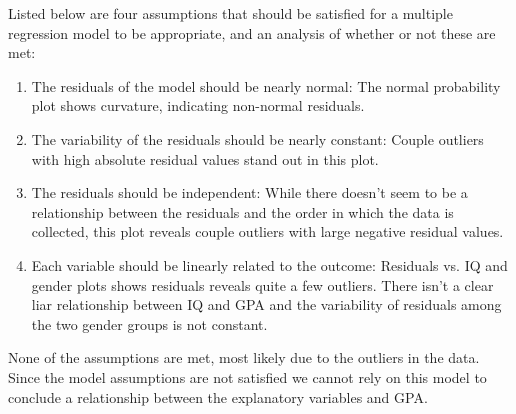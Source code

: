 
{
Listed below are four assumptions that should be satisfied for a multiple regression model to be appropriate, and an analysis of whether or not these are met:
\begin{enumerate}[1.]
\item The residuals of the model should be nearly normal: The normal probability plot shows curvature, indicating non-normal residuals.
\item The variability of the residuals should be nearly constant: Couple outliers with high absolute residual values stand out in this plot.
\item The residuals should be independent: While there doesn't seem to be a relationship between the residuals and the order in which the data is collected, this plot reveals couple outliers with large negative residual values.
\item Each variable should be linearly related to the outcome: Residuals vs. IQ and gender plots shows residuals reveals quite a few outliers. There isn't a clear liar relationship between IQ and GPA and the variability of residuals among the two gender groups is not constant.
\end{enumerate}
None of the assumptions are met, most likely due to the outliers in the data. Since the model assumptions are not satisfied we cannot rely on this model to conclude a relationship between the explanatory variables and GPA.
}


